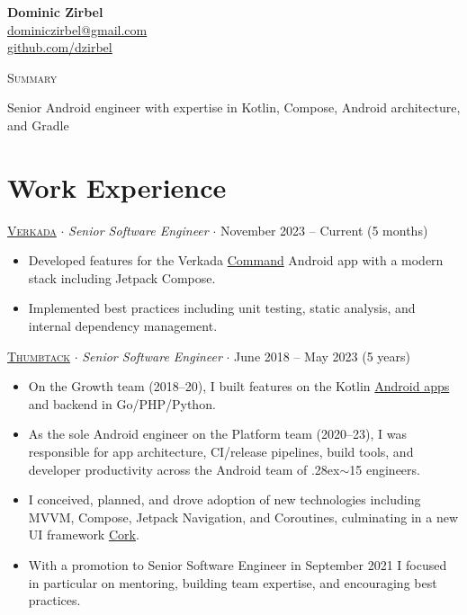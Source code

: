 \documentclass[letterpaper,10pt]{article}
\newcommand{\nicetilde}{\raise.28ex\hbox{$\scriptstyle\sim$}}
\newcommand{\mediumlogo}{\hspace{.75mm}\raisebox{-.15\height}{}\hspace{1mm}}
\begin{document}
\thispagestyle{empty}

\begin{flushright}
    \textbf{\Large{Dominic Zirbel}} \\
    \href{mailto:dominiczirbel@gmail.com}{dominiczirbel@gmail.com} \\
    \href{https://github.com/dzirbel}{ github.com/dzirbel}
\end{flushright}

\begin{minipage}[t]{.115\linewidth}
    {\large{\textsc{Summary}}}
\end{minipage}
\begin{minipage}[t]{.875\linewidth}
    Senior Android engineer with expertise in Kotlin, Compose, Android architecture, and Gradle
\end{minipage}

\section{Work Experience}

\href{https://www.verkada.com/about/}{\textsc{Verkada}} $\cdot$ \textit{Senior Software Engineer} $\cdot$ November 2023 -- Current (5 months)
\begin{itemize}[itemsep=2pt, parsep=0pt, partopsep=0pt]
  \item Developed features for the Verkada \href{https://play.google.com/store/apps/details?id=com.verkada.android}{Command} Android app with a modern stack including Jetpack Compose.
  \item Implemented best practices including unit testing, static analysis, and internal dependency management.
\end{itemize}

\vspace{4pt}

\href{https://www.thumbtack.com/about}{\textsc{Thumbtack}} $\cdot$ \textit{Senior Software Engineer} $\cdot$ June 2018 -- May 2023 (5 years)
\begin{itemize}[itemsep=2pt, parsep=0pt, partopsep=0pt]
  \item On the Growth team (2018--20), I built features on the Kotlin \href{https://play.google.com/store/apps/developer?id=Thumbtack&hl=en_US&gl=US}{Android apps} and backend in Go/PHP/Python.
  \item As the sole Android engineer on the Platform team (2020--23), I was responsible for app architecture, CI/release pipelines, build tools, and developer productivity across the Android team of \nicetilde15 engineers.
  \item I conceived, planned, and drove adoption of new technologies including MVVM, Compose, Jetpack Navigation, and Coroutines, culminating in a new UI framework \href{https://medium.com/thumbtack-engineering/61a24e5e82b6}{\mediumlogo \underline{Cork}}.
  \item With a promotion to Senior Software Engineer in September 2021 I focused in particular on mentoring, building team expertise, and encouraging best practices.
\end{itemize}
\end{document}

